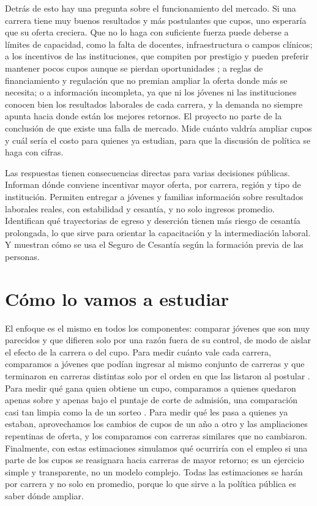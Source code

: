 \documentclass[11pt,a4paper]{article}
\begin{document}
Detrás de esto hay una pregunta sobre el funcionamiento del mercado. Si una carrera tiene muy buenos resultados y más postulantes que cupos, uno esperaría que su oferta creciera. Que no lo haga con suficiente fuerza puede deberse a límites de capacidad, como la falta de docentes, infraestructura o campos clínicos; a los incentivos de las instituciones, que compiten por prestigio y pueden preferir mantener pocos cupos aunque se pierdan oportunidades \citep{epple2006,blair2021}; a reglas de financiamiento y regulación que no premian ampliar la oferta donde más se necesita; o a información incompleta, ya que ni los jóvenes ni las instituciones conocen bien los resultados laborales de cada carrera, y la demanda no siempre apunta hacia donde están los mejores retornos. El proyecto no parte de la conclusión de que existe una falla de mercado. Mide cuánto valdría ampliar cupos y cuál sería el costo para quienes ya estudian, para que la discusión de política se haga con cifras.

Las respuestas tienen consecuencias directas para varias decisiones públicas. Informan dónde conviene incentivar mayor oferta, por carrera, región y tipo de institución. Permiten entregar a jóvenes y familias información sobre resultados laborales reales, con estabilidad y cesantía, y no solo ingresos promedio. Identifican qué trayectorias de egreso y deserción tienen más riesgo de cesantía prolongada, lo que sirve para orientar la capacitación y la intermediación laboral. Y muestran cómo se usa el Seguro de Cesantía según la formación previa de las personas.

\section{Cómo lo vamos a estudiar}

El enfoque es el mismo en todos los componentes: comparar jóvenes que son muy parecidos y que difieren solo por una razón fuera de su control, de modo de aislar el efecto de la carrera o del cupo. Para medir cuánto vale cada carrera, comparamos a jóvenes que podían ingresar al mismo conjunto de carreras y que terminaron en carreras distintas solo por el orden en que las listaron al postular \citep{mountjoy2021}. Para medir qué gana quien obtiene un cupo, comparamos a quienes quedaron apenas sobre y apenas bajo el puntaje de corte de admisión, una comparación casi tan limpia como la de un sorteo \citep{hastings2013,zimmerman2014,black2023}. Para medir qué les pasa a quienes ya estaban, aprovechamos los cambios de cupos de un año a otro y las ampliaciones repentinas de oferta, y los comparamos con carreras similares que no cambiaron. Finalmente, con estas estimaciones simulamos qué ocurriría con el empleo si una parte de los cupos se reasignara hacia carreras de mayor retorno; es un ejercicio simple y transparente, no un modelo complejo. Todas las estimaciones se harán por carrera y no solo en promedio, porque lo que sirve a la política pública es saber dónde ampliar.
\end{document}
